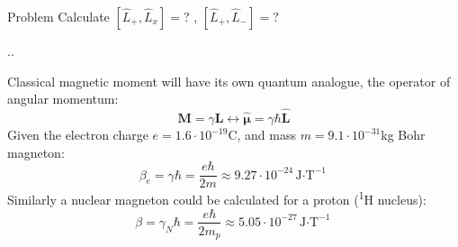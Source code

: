 \documentclass[handout]{beamer}
\begin{document}
\begin{frame}
		\begin{block}{Problem}
			Calculate $[\hat{L}_{+}, \hat{L}_x ] = ?$ , $[\hat{L}_{+}, \hat{L}_{-} ] = ?$ 
		\end{block}



\end{frame}




\begin{frame}{\thesection.\thesubsection. \insertsubsection}

		
			Classical magnetic moment will have its own quantum analogue, the operator of angular momentum:
			\begin{equation}\label{eq:orbital_angular_momentum}
			\bm{M} = \gamma \bm{L}  \longleftrightarrow \bm{\hat{\mu}} = \gamma \hbar \bm{\hat{L}}
			\end{equation} 
		\onslide<2-> Given the electron charge $e= 1.6 \cdot 10^{-19}$C, and mass $m = 9.1 \cdot 10^{-31}$kg   \alert{Bohr magneton}:
		\begin{equation}
			\beta_e = \gamma \hbar = \dfrac{e\hbar}{2m} \approx 9.27 \cdot 10^{-24}  \text{J$\cdot$T}^{-1}
		\end{equation}
		\onslide<3-> Similarly a \alert{nuclear magneton} could be calculated for a proton (\textsuperscript{1}H nucleus):
		\begin{equation}
		\beta = \gamma_N \hbar = \dfrac{e\hbar}{2m_p} \approx 5.05 \cdot 10^{-27}  \text{J$\cdot$T}^{-1}
		\end{equation}
		


\end{frame}
\end{document}
